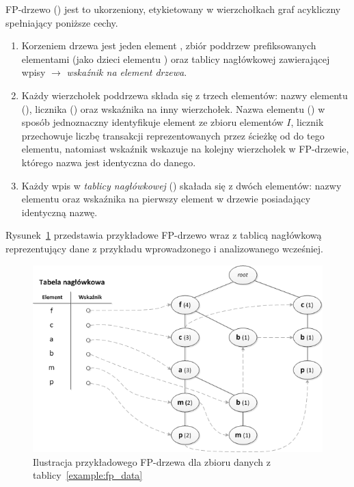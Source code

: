 \begin{df}\label{fptree:def}
FP-drzewo () jest to ukorzeniony, etykietowany w wierzchołkach graf acykliczny spełniający poniższe cechy.
\end{df}
\begin{enumerate}
	\item Korzeniem drzewa jest jeden element , zbiór poddrzew prefiksowanych elementami (jako dzieci elementu ) oraz tablicy nagłówkowej zawierającej wpisy  $\rightarrow$ \emph{wskaźnik na element drzewa}.
	\item Każdy wierzchołek poddrzewa składa się z trzech elementów: nazwy elementu (), licznika () oraz wskaźnika na inny wierzchołek. Nazwa elementu () w sposób jednoznaczny identyfikuje element ze zbioru elementów $I$, licznik przechowuje liczbę transakcji reprezentowanych przez ścieżkę od  do tego elementu, natomiast wskaźnik wskazuje na kolejny wierzchołek w FP-drzewie, którego nazwa jest identyczna do danego.
	\item Każdy wpis w \emph{tablicy nagłówkowej} () skałada się z dwóch elementów: nazwy elementu oraz wskaźnika na pierwszy element w drzewie posiadający identyczną nazwę.
\end{enumerate}

Rysunek~\ref{rys:fptree} przedstawia przykładowe FP-drzewo wraz z tablicą nagłówkową reprezentujący dane z przykładu wprowadzonego i analizowanego wcześniej.

\begin{figure}[ht]
\centering\includegraphics{figures/02/fptree.png}
\caption{Ilustracja przykładowego FP-drzewa dla zbioru danych z tablicy~\ref{example:fp_data}}\label{rys:fptree}
\end{figure}

